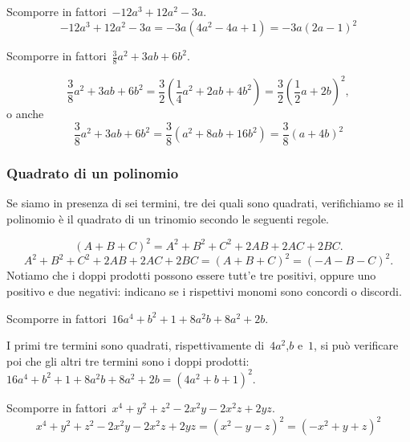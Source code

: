  \begin{esempio}
Scomporre in fattori~\(-12a^{3}+12a^{2}-3a\).
\[-12a^{3}+12a^{2}-3a=-3a\left(4a^{2}-4a+1\right)=-3a(2a-1)^{2}\]
 \end{esempio}

 \begin{esempio}
Scomporre in fattori~\(\frac{3}{8}a^{2}+3ab+6b^{2}\).

\[\frac{3}{8}a^{2}+3ab+6b^{2}=
  \frac{3}{2}\left(\frac{1}{4}a^{2}+2ab+4b^{2}\right)=
  \frac{3}{2}\left(\frac{1}{2}a+2b\right)^{2},\]
o anche
\[\frac{3}{8}a^{2}+3ab+6b^{2}=
  \frac{3}{8}\left(a^{2}+8ab+16b^{2} \right)=
  \frac{3}{8}\left(a+4b\right)^{2}\]
 \end{esempio}

\subsubsection{Quadrato di un polinomio}
\label{subsubsec:divpol_quadpol}

Se siamo in presenza di sei termini, tre dei quali sono quadrati, verifichiamo 
se il polinomio è il quadrato di un trinomio secondo le seguenti regole.

\begin{equation*}
(A+B+C)^{2}=A^{2}+B^{2}+C^{2}+2AB+2AC+2BC.
\end{equation*}
\begin{equation*}
A^{2}+B^{2}+C^{2}+2AB+2AC+2BC=(A+B+C)^{2}=(-A-B-C)^{2}.
\end{equation*}
Notiamo che i doppi prodotti possono essere tutt'e tre positivi, oppure uno 
positivo e due negativi: indicano se i rispettivi monomi sono concordi o 
discordi.

 \begin{esempio}
Scomporre in fattori~\(16a^{4}+b^{2}+1+8a^{2}b+8a^{2}+2b\).

I primi tre termini sono quadrati, rispettivamente di~\(4a^{2}\),\(b\) e~\(1\), 
si può verificare poi che gli altri tre termini sono i doppi 
prodotti:~\(16a^{4}+b^{2}+1+8a^{2}b+8a^{2}+2b=\left(4a^{2}+b+1\right)^{2}\).
 \end{esempio}

 \begin{esempio}
Scomporre in fattori~\(x^{4}+y^{2}+z^{2}-2x^{2}y-2x^{2}z+2yz\).
\[x^{4}+y^{2}+z^{2}-2x^{2}y-2x^{2}z+2yz=
  \left(x^{2}-y-z\right)^{2}=\left(-x^{2}+y+z\right)^{2}\]
 \end{esempio}

